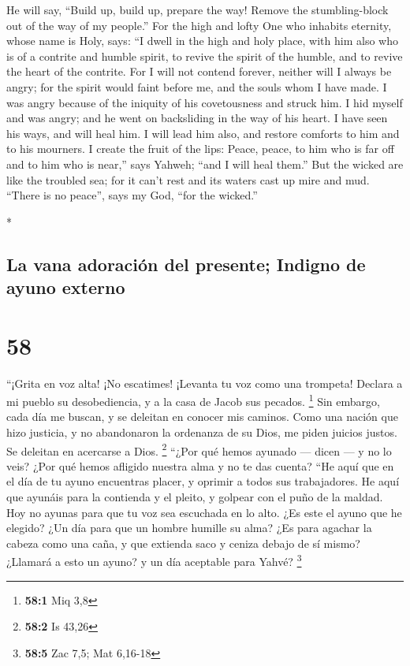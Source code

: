 \begin{paracol}{2}
\begin{otherlanguage}{english}
 He will say, ``Build up, build up, prepare the way!
Remove the stumbling-block out of the way of my people.''
 For the high and lofty One who inhabits eternity, whose
name is Holy, says: ``I dwell in the high and holy place, with him also
who is of a contrite and humble spirit, to revive the spirit of the
humble, and to revive the heart of the contrite.  For I
will not contend forever, neither will I always be angry; for the spirit
would faint before me, and the souls whom I have made.  I
was angry because of the iniquity of his covetousness and struck him. I
hid myself and was angry; and he went on backsliding in the way of his
heart.  I have seen his ways, and will heal him. I will
lead him also, and restore comforts to him and to his mourners.
 I create the fruit of the lips: Peace, peace, to him who
is far off and to him who is near,'' says Yahweh; ``and I will heal
them.''  But the wicked are like the troubled sea; for it
can't rest and its waters cast up mire and mud.  ``There
is no peace'', says my God, ``for the wicked.''

\end{otherlanguage}

\switchcolumn[0]*

\hypertarget{la-vana-adoraciuxf3n-del-presente-indigno-de-ayuno-externo}{%
\subsection{La vana adoración del presente; Indigno de ayuno
externo}\label{la-vana-adoraciuxf3n-del-presente-indigno-de-ayuno-externo}}

\hypertarget{section-114}{%
\section{58}\label{section-114}}

 ``¡Grita en voz alta! ¡No escatimes! ¡Levanta tu voz como
una trompeta! Declara a mi pueblo su desobediencia, y a la casa de Jacob
sus pecados. \footnote{\textbf{58:1} Miq 3,8}  Sin
embargo, cada día me buscan, y se deleitan en conocer mis caminos. Como
una nación que hizo justicia, y no abandonaron la ordenanza de su Dios,
me piden juicios justos. Se deleitan en acercarse a Dios. \footnote{\textbf{58:2}
  Is 43,26}  ``¿Por qué hemos ayunado --- dicen --- y no
lo veis? ¿Por qué hemos afligido nuestra alma y no te das cuenta? ``He
aquí que en el día de tu ayuno encuentras placer, y oprimir a todos sus
trabajadores.  He aquí que ayunáis para la contienda y el
pleito, y golpear con el puño de la maldad. Hoy no ayunas para que tu
voz sea escuchada en lo alto.  ¿Es este el ayuno que he
elegido? ¿Un día para que un hombre humille su alma? ¿Es para agachar la
cabeza como una caña, y que extienda saco y ceniza debajo de sí mismo?
¿Llamará a esto un ayuno? y un día aceptable para Yahvé? \footnote{\textbf{58:5}
  Zac 7,5; Mat 6,16-18}


\end{paracol}
